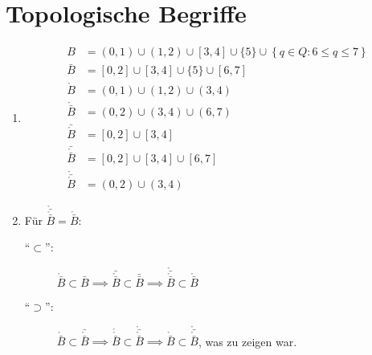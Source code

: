 \documentclass[sectionformat=aufgabe]{gadsescript}
\begin{document}
\section{Topologische Begriffe}
\begin{enumerate}[label=(\alph*)]
	\item 
		\begin{align*}
			B &= (0, 1) \cup (1, 2) \cup [3, 4] \cup \{5\} \cup \left\{ q \in Q: 6 \leq q \leq 7 \right\} \\
			\bar{B} &= [0, 2] \cup [3, 4] \cup \{5\} \cup [6, 7] \\
			\mathring{B} &= (0, 1) \cup (1, 2) \cup (3, 4) \\
			\mathring{\bar{B} } &= (0, 2) \cup (3, 4) \cup (6, 7) \\
			\bar{\mathring{B} } &= [0, 2] \cup [3, 4] \\
			\bar{\mathring{\bar{B} } } &= [0, 2] \cup [3, 4] \cup [6, 7] \\
			\mathring{\bar{\mathring{B} } } &= (0, 2) \cup (3, 4)
		\end{align*}
	\item Für $ \mathring{\bar{\mathring{\bar{B} }} } = \mathring{\bar{B} } $:
		\begin{description}
			\item[``$ \subset  $'':] $ \mathring{\bar{B} } \subset \bar{B} \implies \bar{\mathring{\bar{B} } } \subset \bar{\bar{B} } \implies \mathring{\bar{\mathring{\bar{B} } } } \subset \mathring{\bar{B} }  $
			\item[``$ \supset $'':] $ \mathring{\bar{B} } \subset \bar{\mathring{\bar{B} } } \implies \mathring{\mathring{\bar{B} } } \subset \mathring{\bar{\mathring{\bar{B} } } } \implies \mathring{\bar{B} } \subset \mathring{\bar{\mathring{\bar{B} } } }  $, was zu zeigen war.
		\end{description}


\end{enumerate}
\end{document}
